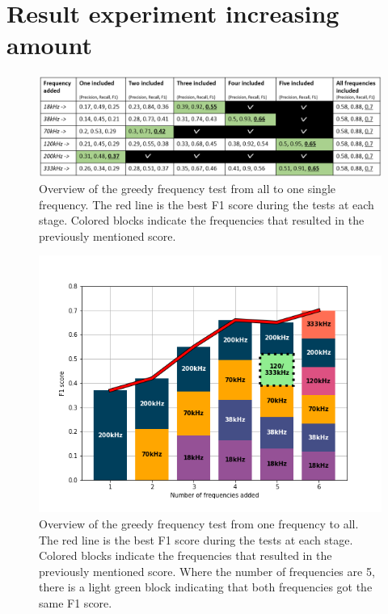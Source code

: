 \section{Result experiment increasing amount}
    \clearpage
    \begin{figure}[H]
        \centering
        \includegraphics[scale=0.6]{figures/results_increasing_table.png}
        \caption{Overview of the greedy frequency test from all to one single frequency. The red line is the best F1 score during the tests at each stage. Colored blocks indicate the frequencies that resulted in the previously mentioned score.}
      	\medskip 
        \label{results_increasing_table}
    \end{figure}
    \clearpage
    \begin{figure}[H]
        \centering
        \includegraphics[scale=0.8]{figures/legge_til_frekvenser.png}
        \caption{Overview of the greedy frequency test from one frequency to all. The red line is the best F1 score during the tests at each stage. Colored blocks indicate the frequencies that resulted in the previously mentioned score. Where the number of frequencies are 5, there is a light green block indicating that both frequencies got the same F1 score.}
      	\medskip 
        \label{dincrease_amount_fig}
    \end{figure}